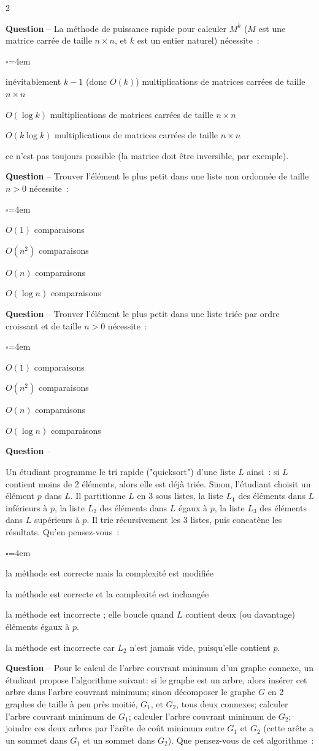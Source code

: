 \documentclass[11pt]{article}
\newcounter{QNumber}
\newcommand{\Question}[2][:]{
 \stepcounter{QNumber}
  \noindent\textbf{Question \theQNumber} --
  #2~#1}
\newenvironment{Reponse}{
 \begin{list}{$\square$}{\leftmargin=4em}}{
 \end{list}\vspace{1em}}
\newcommand{\Vrai}{
 \item[\ifthenelse{\boolean{correction}}{$\blacksquare$}{$\square$}]}
\newcommand{\Faux}{\item[$\square$]}
\begin{document}
\begin{multicols}{2}
\Question{La m\'ethode de puissance rapide pour calculer $M^k$ ($M$ est une matrice carr\'ee de taille $n\times n$, et $k$ est un entier naturel)  n\'ecessite}  
\begin{Reponse}
\Faux in\'evitablement $k-1$ (donc $O(k)$) multiplications de matrices carr\'ees de taille $n\times n$
\Vrai $O(\log k)$ multiplications de matrices carr\'ees de taille $n\times n$
\Vrai $O(k\log k)$ multiplications de matrices carr\'ees de taille $n\times n$
\Faux ce n'est pas toujours possible (la matrice doit \^etre inversible, par exemple).
\end{Reponse}


\Question{Trouver l'\'el\'ement le plus petit dans une liste non ordonn\'ee de taille $n>0$  n\'ecessite}
\begin{Reponse} 
\Faux $O(1)$ comparaisons
\Faux $O(n^2)$ comparaisons
\Vrai $O(n)$ comparaisons
\Faux $O(\log n)$ comparaisons
\end{Reponse} 

\Question{Trouver l'\'el\'ement le plus petit dans une liste tri\'ee par ordre croissant et de taille $n>0$  n\'ecessite}
\begin{Reponse} 
\Vrai $O(1)$ comparaisons
\Faux $O(n^2)$ comparaisons
\Vrai $O(n)$ comparaisons
\Faux $O(\log n)$ comparaisons
\end{Reponse}


\Question{
Un \'etudiant programme le tri rapide ("quicksort") d'une liste $L$ ainsi~: si $L$  contient moins de 2 \'el\'ements, alors elle est d\'ej\`a tri\'ee. Sinon, l'\'etudiant choisit un \'el\'ement $p$  dans $L$. Il partitionne $L$  
en 3 sous listes, la liste $L_1$ des \'el\'ements dans $L$ inf\'erieurs \`a $p$, la liste $L_2$ des \'el\'ements dans $L$
\'egaux \`a $p$,  
la liste $L_3$  des \'el\'ements dans $L$ sup\'erieurs \`a $p$. Il trie r\'ecursivement les 3 listes, puis concat\`ene les r\'esultats. 
Qu'en pensez-vous}
\begin{Reponse}
\Faux la m\'ethode est correcte mais la complexit\'e est modifi\'ee
\Faux la m\'ethode est correcte et la complexit\'e est inchang\'ee
\Vrai la m\'ethode est incorrecte ; elle boucle quand  $L$ contient deux (ou davantage) \'el\'ements \'egaux \`a $p$.
\Faux la m\'ethode est incorrecte car $L_2$ n'est jamais vide, puisqu'elle contient $p$.
\end{Reponse}


\Question{Pour le calcul de l'arbre couvrant minimum d'un graphe connexe, 
un \'etudiant propose l'algorithme suivant: si le graphe est un arbre, alors ins\'erer cet arbre dans l'arbre couvrant minimum;
sinon d\'ecomposer le graphe $G$ en 2 graphes de taille \`a peu pr\`es moiti\'e, $G_1$, et $G_2$, tous deux connexes; calculer
l'arbre couvrant minimum de $G_1$; calculer l'arbre couvrant minimum de $G_2$; joindre ces deux arbres par l'ar\^ete de co\^ut
 minimum entre $G_1$ et $G_2$ (cette ar\^ete a un sommet dans $G_1$ et un sommet dans $G_2$). 
Que pensez-vous de cet algorithme} 


\end{multicols}
\end{document}
